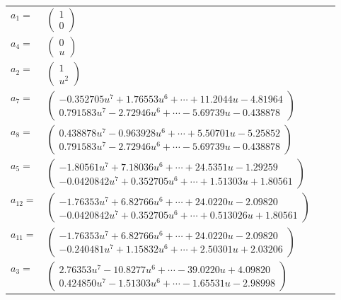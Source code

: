 \documentclass[1p]{elsarticle_modified}
\theoremstyle{definition}
\begin{document}
\begin{tabular}{m{7pt} m{180pt} m{7pt} m{180pt} }
\flushright $a_{1}=$&$\begin{pmatrix}1\\0\end{pmatrix}$ \\
\flushright $a_{4}=$&$\begin{pmatrix}0\\u\end{pmatrix}$ \\
\flushright $a_{2}=$&$\begin{pmatrix}1\\u^2\end{pmatrix}$ \\
\flushright $a_{7}=$&$\begin{pmatrix}-0.352705 u^{7}+1.76553 u^{6}+\cdots+11.2044 u-4.81964\\0.791583 u^{7}-2.72946 u^{6}+\cdots-5.69739 u-0.438878\end{pmatrix}$ \\
\flushright $a_{8}=$&$\begin{pmatrix}0.438878 u^{7}-0.963928 u^{6}+\cdots+5.50701 u-5.25852\\0.791583 u^{7}-2.72946 u^{6}+\cdots-5.69739 u-0.438878\end{pmatrix}$ \\
\flushright $a_{5}=$&$\begin{pmatrix}-1.80561 u^{7}+7.18036 u^{6}+\cdots+24.5351 u-1.29259\\-0.0420842 u^{7}+0.352705 u^{6}+\cdots+1.51303 u+1.80561\end{pmatrix}$ \\
\flushright $a_{12}=$&$\begin{pmatrix}-1.76353 u^{7}+6.82766 u^{6}+\cdots+24.0220 u-2.09820\\-0.0420842 u^{7}+0.352705 u^{6}+\cdots+0.513026 u+1.80561\end{pmatrix}$ \\
\flushright $a_{11}=$&$\begin{pmatrix}-1.76353 u^{7}+6.82766 u^{6}+\cdots+24.0220 u-2.09820\\-0.240481 u^{7}+1.15832 u^{6}+\cdots+2.50301 u+2.03206\end{pmatrix}$ \\
\flushright $a_{3}=$&$\begin{pmatrix}2.76353 u^{7}-10.8277 u^{6}+\cdots-39.0220 u+4.09820\\0.424850 u^{7}-1.51303 u^{6}+\cdots-1.65531 u-2.98998\end{pmatrix}$ \\

\end{tabular}
\end{document}
